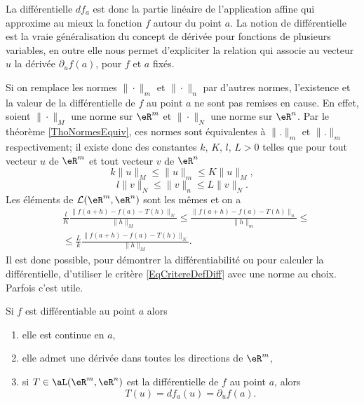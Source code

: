 La différentielle $df_a$ est donc la partie linéaire de l'application affine qui approxime au mieux la fonction $f$ autour du point $a$. La notion de différentielle est la vraie généralisation du concept de dérivée pour fonctions de plusieurs variables, en outre elle nous permet d'expliciter la relation qui associe au vecteur $u$ la dérivée $\partial_u f(a)$, pour $f$ et $a$ fixés.  

\begin{remark}
	Si on remplace les normes $\|\cdot\|_m$  et $\|\cdot\|_n$ par d'autres normes, l'existence et la valeur de la différentielle de $f$ au point $a$ ne sont pas remises en cause. En effet, soient  $\|\cdot\|_M$  une norme sur $\eR^m$ et $\|\cdot\|_N$ une norme sur $\eR^n$. Par le théorème \ref{ThoNormesEquiv}, ces normes sont équivalentes à $\| . \|_m$ et $\| . \|_m$ respectivement; il existe donc des constantes $k,\, K,\, l,\,L >0$ telles que  pour tout vecteur $u$ de $\eR^m$ et tout vecteur $v$ de $\eR^n$   
\[
k\|u\|_M\leq \|u\|_m\leq K\|u\|_M,
\]
\[
l\|v\|_N\leq \|v\|_n\leq L\|v\|_N.
\]
Les éléments de $\mathcal{L}(\eR^m, \eR^n)$ sont les mêmes et on a 
\begin{equation}
  \begin{aligned}
 & \frac{l}{K}  \frac{\|f(a+h)-f(a)-T(h)\|_N}{\|h\|_M}\leq \frac{\|f(a+h)-f(a)-T(h)\|_n}{\|h\|_m}\leq\\
&\leq\frac{L}{k} \frac{\|f(a+h)-f(a)-T(h)\|_N}{\|h\|_M}.
  \end{aligned}
\end{equation}
Il est donc possible, pour démontrer la différentiabilité ou pour calculer la différentielle, d'utiliser le critère \eqref{EqCritereDefDiff} avec une norme au choix. Parfois c'est utile.
\end{remark}

\begin{proposition}\label{diff1}
    Si $f$ est différentiable au point $a$ alors
    \begin{enumerate}
        \item
            elle est continue en \( a\),
        \item
            elle admet une dérivée dans toutes les directions de \( \eR^m\),
        \item
            si $T\in\aL(\eR^m,\eR^n)$ est la différentielle de $f$ au point $a$, alors
            \begin{equation}
                T(u)=df_a(u)=\partial_u f(a). 
            \end{equation}
    \end{enumerate}
\end{proposition}

